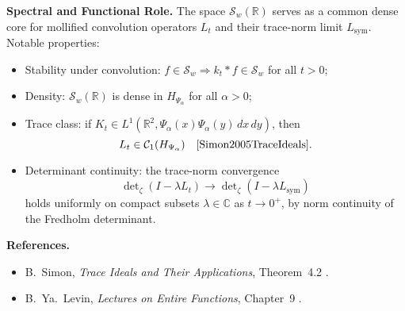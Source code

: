 \begin{definition}
\medskip
\noindent\textbf{Spectral and Functional Role.}
The space \( \mathcal{S}_w(\mathbb{R}) \) serves as a common dense core for mollified convolution operators \( L_t \) and their trace-norm limit \( L_{\mathrm{sym}} \). Notable properties:
\begin{itemize}
    \item Stability under convolution: \( f \in \mathcal{S}_w \Rightarrow k_t * f \in \mathcal{S}_w \) for all \( t > 0 \);
    \item Density: \( \mathcal{S}_w(\mathbb{R}) \) is dense in \( H_{\Psi_\alpha} \) for all \( \alpha > 0 \);
    \item Trace class: if \( K_t \in L^1(\mathbb{R}^2, \Psi_\alpha(x)\Psi_\alpha(y)\, dx\,dy) \), then
    \[
    L_t \in \mathcal{C}_1(H_{\Psi_\alpha}) \quad \text{\cite[Thm.~4.2]{Simon2005TraceIdeals}}.
    \]
    \item Determinant continuity: the trace-norm convergence
    \[
    \det\nolimits_\zeta(I - \lambda L_t) \to \det\nolimits_\zeta(I - \lambda L_{\mathrm{sym}})
    \]
    holds uniformly on compact subsets \( \lambda \in \mathbb{C} \) as \( t \to 0^+ \), by norm continuity of the Fredholm determinant.
\end{itemize}

\medskip
\noindent\textbf{References.}
\begin{itemize}
    \item B.~Simon, \emph{Trace Ideals and Their Applications}, Theorem~4.2 \cite{Simon2005TraceIdeals}.
    \item B.~Ya.~Levin, \emph{Lectures on Entire Functions}, Chapter~9 \cite{Levin1996EntireLectures}.
\end{itemize}
\end{definition}
